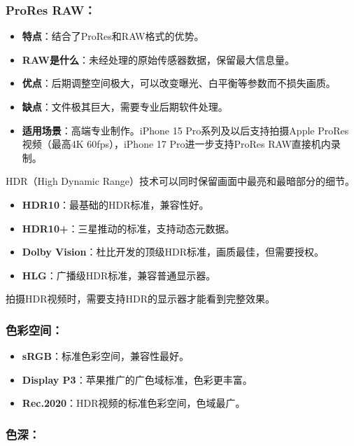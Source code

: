 \subsubsection*{ProRes RAW：}

\begin{itemize}
  \item \textbf{特点}：结合了ProRes和RAW格式的优势。
  \item \textbf{RAW是什么}：未经处理的原始传感器数据，保留最大信息量。
  \item \textbf{优点}：后期调整空间极大，可以改变曝光、白平衡等参数而不损失画质。
  \item \textbf{缺点}：文件极其巨大，需要专业后期软件处理。
  \item \textbf{适用场景}：高端专业制作。iPhone 15 Pro系列及以后支持拍摄Apple ProRes视频（最高4K 60fps），iPhone 17 Pro进一步支持ProRes RAW直接机内录制。
\end{itemize}


HDR（High Dynamic Range）技术可以同时保留画面中最亮和最暗部分的细节。

\begin{itemize}
  \item \textbf{HDR10}：最基础的HDR标准，兼容性好。
  \item \textbf{HDR10+}：三星推动的标准，支持动态元数据。
  \item \textbf{Dolby Vision}：杜比开发的顶级HDR标准，画质最佳，但需要授权。
  \item \textbf{HLG}：广播级HDR标准，兼容普通显示器。
\end{itemize}

拍摄HDR视频时，需要支持HDR的显示器才能看到完整效果。


\subsubsection*{色彩空间：}

\begin{itemize}
  \item \textbf{sRGB}：标准色彩空间，兼容性最好。
  \item \textbf{Display P3}：苹果推广的广色域标准，色彩更丰富。
  \item \textbf{Rec.2020}：HDR视频的标准色彩空间，色域最广。
\end{itemize}

\subsubsection*{色深：}


